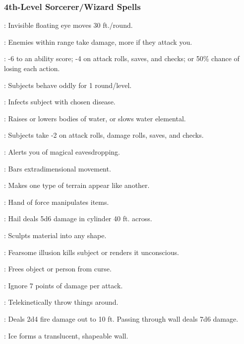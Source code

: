 \subsubsection{4th-Level Sorcerer/Wizard Spells}
\begin{list}{}{\leftmargin=1em}
\item {}: Invisible floating eye moves 30 ft./round.
\item {}: Enemies within range take damage, more if they attack you.
\item {}: -6 to an ability score; -4 on attack rolls, saves, and checks; or 50\% chance of losing each action.
\item {}: Subjects behave oddly for 1 round/level.
\item {}: Infects subject with chosen disease.
\item {}: Raises or lowers bodies of water, or slows water elemental.
\item {}: Subjects take -2 on attack rolls, damage rolls, saves, and checks.
\item {}: Alerts you of magical eavesdropping.
\item {}: Bars extradimensional movement.
\item {}: Makes one type of terrain appear like another.
\item {}: Hand of force manipulates items.
\item {}: Hail deals 5d6 damage in cylinder 40 ft. across.
\item {}: Sculpts material into any shape.
\item {}: Fearsome illusion kills subject or renders it unconscious.
\item {}: Frees object or person from curse.
\item {}: Ignore 7 points of damage per attack.
\item {}: Telekinetically throw things around.
\item {}: Deals 2d4 fire damage out to 10 ft. Passing through wall deals 7d6 damage.
\item {}: Ice forms a translucent, shapeable wall.
\end{list}
